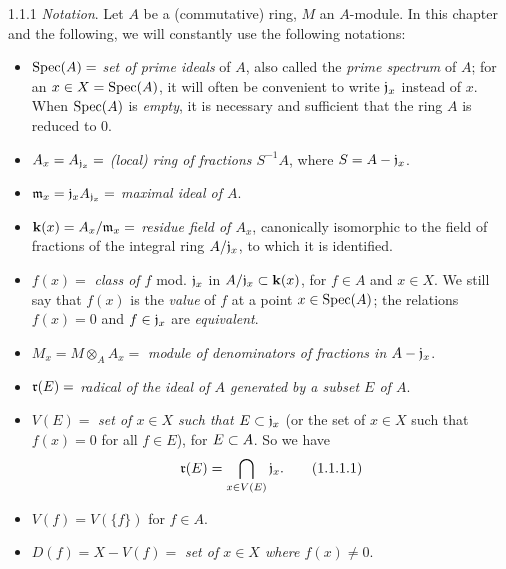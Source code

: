 \documentclass[../main.tex]{subfiles}
\begin{document}
\begin{cx}{1.1.1}
\emph{Notation}. Let $A$ be a (commutative) ring, $M$ an $A$-module. In
this chapter and the following, we will constantly use the following notations:
\begin{itemize}
  \item[] $\operatorname{Spec}(A)=$ \emph{set of prime ideals} of $A$, also called the
          \emph{prime spectrum} of $A$; for an $x\in X=\operatorname{Spec}(A)$, it will often be
          convenient to write $\mathfrak{j}_x$ instead of $x$. When $\operatorname{Spec}(A)$ is
          \emph{empty}, it is necessary and sufficient that the ring $A$ is
          reduced to $0$.
  \item[] $A_x=A_{\mathfrak{j}_x}=$ \emph{(local) ring of fractions $S^{-1}A$},
          where $S=A-\mathfrak{j}_x$.
  \item[] $\mathfrak{m}_x=\mathfrak{j}_x A_{\mathfrak{j}_x}=$ \emph{maximal ideal of $A$}.
  \item[] $\mathbf{k}(x)=A_x/\mathfrak{m}_x=$ \emph{residue field of $A_x$},
          canonically isomorphic to the field of fractions
          of the integral ring $A/\mathfrak{j}_x$, to which it is identified.
  \item[] $f(x)=$ \emph{class of $f$} mod. $\mathfrak{j}_x$ in $A/\mathfrak{j}_x\subset\mathbf{k}(x)$,
          for $f\in A$ and $x\in X$. We still say that $f(x)$ is the \emph{value}
          of $f$ at a point $x\in\operatorname{Spec}(A)$; the relations $f(x)=0$ and $f\in\mathfrak{j}_x$ are
          \emph{equivalent}.
  \item[] $M_x=M\otimes_A A_x=$ \emph{module of denominators of fractions in $A-\mathfrak{j}_x$}.
  \item[] $\mathfrak{r}(E)=$ \emph{radical of the ideal of $A$ generated by a subset $E$ of $A$}.
  \item[] $V(E)=$ \emph{set of $x\in X$ such that $E\subset\mathfrak{j}_x$} (or the set of $x\in X$
          such that $f(x)=0$ for all $f\in E$), for $E\subset A$. So we have
          \begin{equation}
            \mathfrak{r}(E)=\bigcap_{x\in V(E)}\mathfrak{j}_x.\tag{1.1.1.1}
          \end{equation}
  \item[] $V(f)=V(\{f\})$ for $f\in A$.
  \item[] $D(f)=X-V(f)=$ \emph{set of $x\in X$ where $f(x)\neq 0$}.
\end{itemize}
\end{cx}
\end{document}
